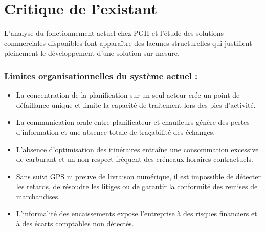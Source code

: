\section{Critique de l'existant}

L'analyse du fonctionnement actuel chez PGH et l'étude des solutions commerciales disponibles font apparaître des lacunes structurelles qui justifient pleinement le développement d'une solution sur mesure.

\subsubsection*{Limites organisationnelles du système actuel :}
\begin{itemize}
  \item La concentration de la planification sur un seul acteur crée un point de défaillance unique et limite la capacité de traitement lors des pics d'activité.
  \item La communication orale entre planificateur et chauffeurs génère des pertes d'information et une absence totale de traçabilité des échanges.
  \item L'absence d'optimisation des itinéraires entraîne une consommation excessive de carburant et un non-respect fréquent des créneaux horaires contractuels.
  \item Sans suivi GPS ni preuve de livraison numérique, il est impossible de détecter les retards, de résoudre les litiges ou de garantir la conformité des remises de marchandises.
  \item L'informalité des encaissements expose l'entreprise à des risques financiers et à des écarts comptables non détectés.
\end{itemize}

